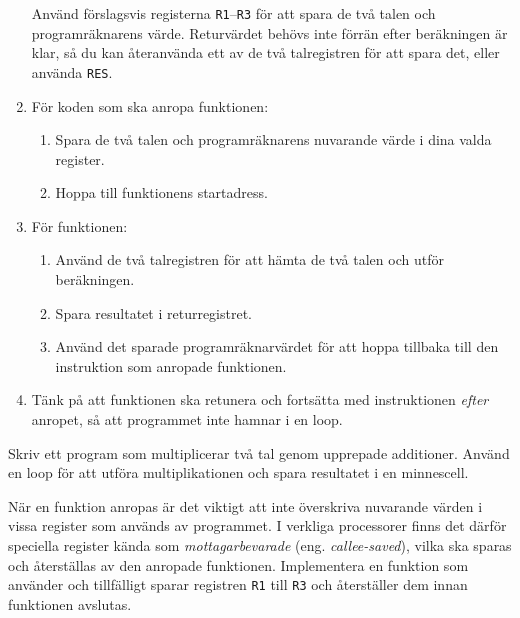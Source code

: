 \begin{Datorarbete}
\begin{enumerate}
              Använd förslagsvis registerna \texttt{R1}--\texttt{R3} för att spara de två talen och programräknarens värde. Returvärdet behövs inte förrän efter beräkningen är klar, så du kan återanvända ett av de två talregistren för att spara det, eller använda \texttt{RES}.
        \item För koden som ska anropa funktionen:
              \begin{enumerate}
                  \item Spara de två talen och programräknarens nuvarande värde i dina valda register.
                  \item Hoppa till funktionens startadress.
              \end{enumerate}
        \item För funktionen:
              \begin{enumerate}
                  \item Använd de två talregistren för att hämta de två talen och utför beräkningen.
                  \item Spara resultatet i returregistret.
                  \item Använd det sparade programräknarvärdet för att hoppa tillbaka till den instruktion som anropade funktionen.
              \end{enumerate}
        \item Tänk på att funktionen ska retunera och fortsätta med instruktionen \emph{efter} anropet, så att programmet inte hamnar i en loop.

    \end{enumerate}

    \item Skriv ett program som multiplicerar två tal genom upprepade additioner. Använd en loop för att utföra multiplikationen och spara resultatet i en minnescell.

    \item När en funktion anropas är det viktigt att inte överskriva nuvarande värden i vissa register som används av programmet. I verkliga processorer finns det därför speciella register kända som \emph{mottagarbevarade} (eng. \emph{callee-saved}), vilka ska sparas och återställas av den anropade funktionen. Implementera en funktion som använder och tillfälligt sparar registren \texttt{R1} till \texttt{R3} och återställer dem innan funktionen avslutas.

\end{Datorarbete}

